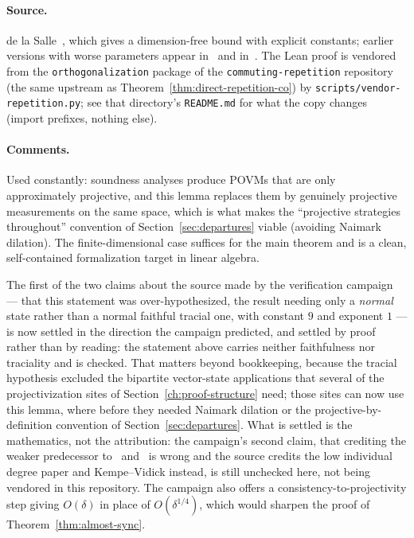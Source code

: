 \paragraph{Source.} de la Salle~\cite{dlS21}, which gives a dimension-free bound with
explicit constants; earlier versions with worse parameters appear in~\cite{KPS18}
and in~\cite{JNVWY20}. The Lean proof is vendored from the
\texttt{orthogonalization} package of the \texttt{commuting-repetition} repository
(the same upstream as Theorem~\ref{thm:direct-repetition-co}) by
\texttt{scripts/vendor-repetition.py}; see that directory's \texttt{README.md} for what
the copy changes (import prefixes, nothing else).

\paragraph{Comments.} Used constantly: soundness analyses produce POVMs that are only
approximately projective, and this lemma replaces them by genuinely projective
measurements on the same space, which is what makes the ``projective strategies
throughout'' convention of Section~\ref{sec:departures} viable (avoiding Naimark
dilation). The finite-dimensional case suffices for the main theorem and is a clean,
self-contained formalization target in linear algebra.

The first of the two claims about the source made by the verification
campaign~\cite{Audit26} --- that this statement was over-hypothesized, the result needing
only a \emph{normal} state rather than a normal faithful tracial one, with constant $9$
and exponent $1$ --- is now settled in the direction the campaign predicted, and settled
by proof rather than by reading: the statement above carries neither faithfulness nor
traciality and is checked. That matters beyond bookkeeping, because the tracial
hypothesis excluded the bipartite vector-state applications that several of the
projectivization sites of Section~\ref{ch:proof-structure} need; those sites can now use
this lemma, where before they needed Naimark dilation or the projective-by-definition
convention of Section~\ref{sec:departures}. What is settled is the mathematics, not the
attribution: the campaign's second claim, that crediting the weaker predecessor
to~\cite{KPS18} and~\cite{JNVWY20} is wrong and the source credits the low individual
degree paper and Kempe--Vidick instead, is still unchecked here, \cite{dlS21} not being
vendored in this repository. The campaign also offers a consistency-to-projectivity step
giving $O(\delta)$ in place of $O(\delta^{1/4})$, which would sharpen the proof of
Theorem~\ref{thm:almost-sync}.

